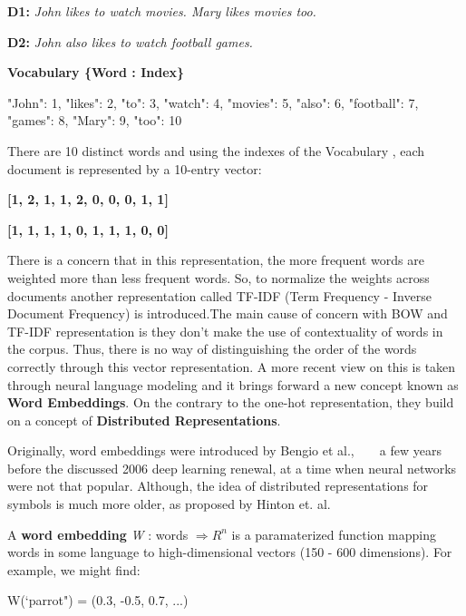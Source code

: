 \textbf{D1:} \textit{John likes to watch movies. Mary likes movies too.}
\newline

\textbf{D2:} \textit{John also likes to watch football games.}
\newline

\textbf{Vocabulary \{Word : Index\}}
\newline

{   "John": 1,    "likes": 2,     "to": 3,     "watch": 4,     "movies": 5,     "also": 6,     "football": 7,     "games": 8,     "Mary": 9,     "too": 10 }
\newline

There are 10 distinct words and using the indexes of the Vocabulary , each document is represented by a 10-entry vector:
\newline

\textbf{[1, 2, 1, 1, 2, 0, 0, 0, 1, 1]}

\textbf{[1, 1, 1, 1, 0, 1, 1, 1, 0, 0]}
\newline 

There is a concern that in this representation, the more frequent words are weighted more than less frequent words. So, to normalize the weights across documents another representation called TF-IDF (Term Frequency - Inverse Document Frequency) is introduced.The main cause of concern with BOW and TF-IDF representation is they don't make the use of contextuality of words in the corpus. Thus, there is no way of distinguishing the order of the words correctly through this vector representation. A more recent view on this is taken through neural language modeling and it brings forward a new concept known as \textbf{Word Embeddings}. On the contrary to the one-hot representation, they build on a concept of \textbf{Distributed Representations}.
\newline

Originally, word embeddings were introduced by Bengio et al., ~\parencite{bengio1} ~\parencite{bengio2} a few years before the discussed 2006 deep learning renewal, at a time when neural networks were not that popular. Although, the idea of distributed representations for symbols is much more older, as proposed by Hinton et. al.~\parencite{hinton1}  

A \textbf{word embedding} \textit{W} : words $\Rightarrow {R}^{n}$ is a paramaterized function mapping words in some language to high-dimensional vectors (150 - 600 dimensions). For example, we might find:

W(‘parrot") = (0.3, -0.5, 0.7, ...)

